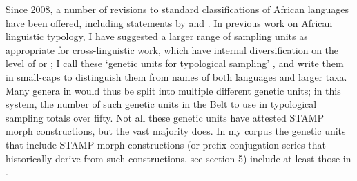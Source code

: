 \documentclass[output=paper]{langsci/langscibook}
\begin{document}
\newpage 
Since 2008, a number of revisions to standard classifications of African languages have been offered, including statements by \cite{Dimmendaal2008, Dimmendaal2011} and \citet{Sands2009}. In previous work on African linguistic typology, I have suggested a larger range of sampling units as appropriate for cross-linguistic work, which have internal diversification on the level of  or ; I call these `genetic units for typological sampling' \citep{Anderson2011}, and write them in small-caps to distinguish them from names of both languages and larger taxa. Many genera in  would thus be split into multiple different genetic units; in this system, the number of such genetic units in the  Belt to use in typological sampling totals over fifty. Not all these genetic units have attested STAMP morph constructions, but the vast majority does. In my corpus the genetic units that include STAMP morph constructions (or prefix conjugation series that historically derive from such constructions, see section 5) include at least those in .
\end{document}

